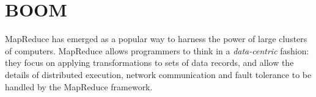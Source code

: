 \section{BOOM}
MapReduce has emerged as a popular way to harness the power of large clusters of
computers. MapReduce allows programmers to think in a \emph{data-centric}
fashion: they focus on applying transformations to sets of data records, and
allow the details of distributed execution, network communication and fault
tolerance to be handled by the MapReduce framework.






